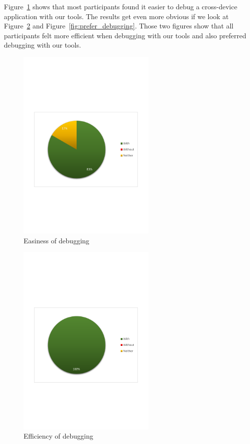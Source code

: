 Figure~\ref{fig:debugging_easier} shows that most participants found it easier to debug a cross-device application with our tools. The results get even more obvious if we look at Figure~\ref{fig:debugging_efficient} and Figure~\ref{fig:prefer_debugging}. Those two figures show that all participants felt more efficient when debugging with our tools and also preferred debugging with our tools.

\begin{figure}[H]
  \centering
    \includegraphics[width=0.6\textwidth]{images/charts/debugging_easier.pdf}
	\caption[Easiness of debugging]{Easiness of debugging}
	\label{fig:debugging_easier}
\end{figure}

\begin{figure}[H]
  \centering
    \includegraphics[width=0.6\textwidth]{images/charts/debugging_efficient.pdf}
	\caption[Efficiency of debugging]{Efficiency of debugging}
	\label{fig:debugging_efficient}
\end{figure}

